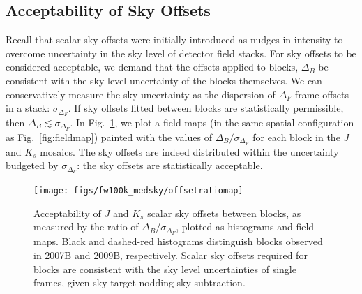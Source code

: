\documentclass[iop]{emulateapj}
\newcommand{\Fig}[1]{Fig.~\ref{fig:#1}}  %
\begin{document}
\begin{table}[t]
\centering
\caption[Hierarchy of scalar sky offsets]{Hierarchy of scalar sky offsets (using \texttt{FW100K} RT flat fielding, and median sky subtraction).
The `Total' sky offsets track the net offset of individual WIRCam image frames into the fitted mosaic.
$\langle I_\mathrm{sky}\rangle$ is taken as the instantaneous sky level for the images being sampled (see \Fig{net_sky_level} for the distribution of levels).
Offset distributions are also presented in units of the WIRCam mosaics, DN, corresponding to a zeropoint of 25 mag.}
\label{tab:offset_hierarchy}

\end{table}

\subsection{Acceptability of Sky Offsets}
\label{sec:offset_acceptability}

Recall that scalar sky offsets were initially introduced as nudges in intensity to overcome uncertainty in the sky level of detector field stacks.
For sky offsets to be considered acceptable, we demand that the offsets applied to blocks, $\Delta_B$ be consistent with the sky level uncertainty of the blocks themselves.
We can conservatively measure the sky uncertainty as the dispersion of $\Delta_F$ frame offsets in a stack: $\sigma_{\Delta_F}$.
If sky offsets fitted between blocks are statistically permissible, then $\Delta_B \lesssim \sigma_{\Delta_F}$.
In \Fig{offset_ratio_map}, we plot a field maps (in the same spatial configuration as \Fig{fieldmap}) painted with the values of $\Delta_B / \sigma_{\Delta_F}$ for each block in the $J$ and $K_s$ mosaics.
The sky offsets are indeed distributed within the uncertainty budgeted by $\sigma_{\Delta_F}$: the sky offsets are statistically acceptable.

\begin{figure}[t]
\centering
\texttt{[image: figs/fw100k\_medsky/offsetratiomap]}
\caption{Acceptability of $J$ and $K_s$ scalar sky offsets between blocks, as measured by the ratio of $\Delta_B/\sigma_{\Delta_F}$, plotted as histograms and field maps. Black and dashed-red histograms distinguish blocks observed in 2007B and 2009B, respectively. Scalar sky offsets required for blocks are consistent with the sky level uncertainties of single frames, given sky-target nodding sky subtraction.}
\label{fig:offset_ratio_map}
\end{figure}
\end{document}
